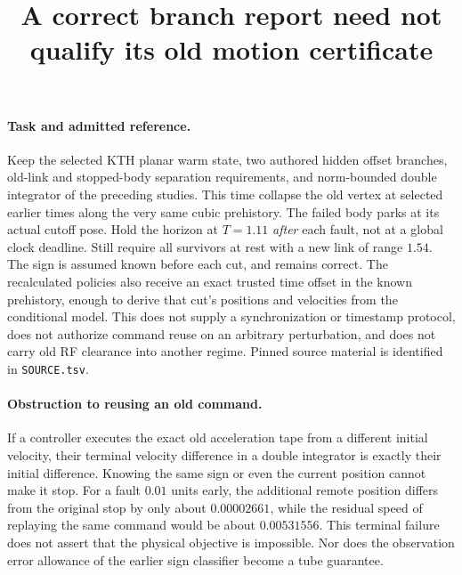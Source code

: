 \documentclass{article}
\title{A correct branch report need not qualify its old motion certificate}
\date{}
\begin{document}
\maketitle

\paragraph{Task and admitted reference.}
Keep the selected KTH planar warm state, two authored hidden offset
branches, old-link and stopped-body separation requirements, and
norm-bounded double integrator of the preceding studies. This time
collapse the old vertex at selected earlier times along the very
same cubic prehistory. The failed body parks at its actual cutoff
pose. Hold the horizon at $T=1.11$ \emph{after} each fault, not at a
global clock deadline. Still require all survivors at rest with
a new link of range $1.54$. The sign is assumed known before each
cut, and remains correct. The recalculated policies also receive an
exact trusted time offset in the known prehistory, enough to derive
that cut's positions and velocities from the conditional model.
This does not supply a synchronization or timestamp protocol,
does not authorize command reuse on an arbitrary perturbation, and
does not carry old RF clearance into another regime. Pinned source
material is identified in \verb|SOURCE.tsv|.

\paragraph{Obstruction to reusing an old command.}
If a controller executes the exact old acceleration tape from a
different initial velocity, their terminal velocity difference in
a double integrator is exactly their initial difference. Knowing
the same sign or even the current position cannot make it stop.
For a fault $0.01$ units early, the additional remote position
differs from the original stop by only about $0.00002661$,
while the residual speed of replaying the same command would be
about $0.00531556$. This terminal failure does not assert that the
physical objective is impossible. Nor does the observation error
allowance of the earlier sign classifier become a tube guarantee.
\end{document}
